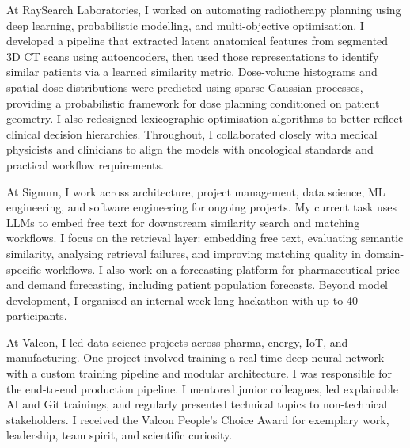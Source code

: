 \documentclass[11pt,a4paper]{moderncv}
\begin{document}
\label{sec:raysearch}
 {
    At RaySearch Laboratories, I worked on automating radiotherapy planning using deep learning, probabilistic modelling, and multi-objective optimisation.
    \newline\hspace*{2em}
    I developed a pipeline that extracted latent anatomical features from segmented 3D CT scans using autoencoders, then used those representations to identify similar patients via a learned similarity metric.
    \newline\hspace*{2em}
    Dose-volume histograms and spatial dose distributions were predicted using sparse Gaussian processes, providing a probabilistic framework for dose planning conditioned on patient geometry. I also redesigned lexicographic optimisation algorithms to better reflect clinical decision hierarchies.
    \newline\hspace*{2em}
    Throughout, I collaborated closely with medical physicists and clinicians to align the models with oncological standards and practical workflow requirements.
}{}

\label{sec:signum}
 {
    At Signum, I work across architecture, project management, data science, ML engineering, and software engineering for ongoing projects.
    \newline\hspace*{2em}
    My current task uses LLMs to embed free text for downstream similarity search and matching workflows. I focus on the retrieval layer: embedding free text, evaluating semantic similarity, analysing retrieval failures, and improving matching quality in domain-specific workflows.
    \newline\hspace*{2em}
    I also work on a forecasting platform for pharmaceutical price and demand forecasting, including patient population forecasts.
    \newline\hspace*{2em}
    Beyond model development, I organised an internal week-long hackathon with up to 40 participants.
}{}

\label{sec:valcon}
 {
    At Valcon, I led data science projects across pharma, energy, IoT, and manufacturing.
    \newline\hspace*{2em}
    One project involved training a real-time deep neural network with a custom training pipeline and modular architecture. I was responsible for the end-to-end production pipeline.
    \newline\hspace*{2em}
    I mentored junior colleagues, led explainable AI and Git trainings, and regularly presented technical topics to non-technical stakeholders. I received the Valcon People's Choice Award for exemplary work, leadership, team spirit, and scientific curiosity.
}{}
\end{document}
